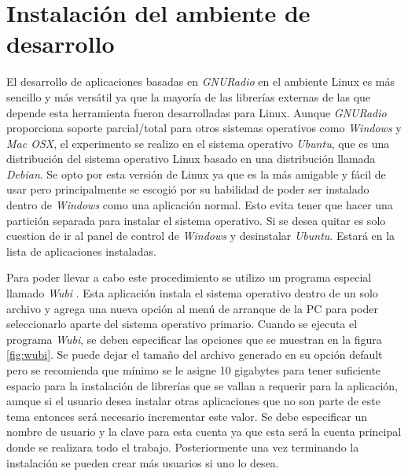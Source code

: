 
\chapter{Instalaci\'on del ambiente de desarrollo}
\label{AppA}

El desarrollo de aplicaciones basadas en \emph{GNURadio} en el ambiente Linux es
m\'as sencillo y m\'as vers\'atil ya que la mayor\'ia de las librer\'ias
externas de las que depende esta herramienta fueron desarrolladas para Linux.
Aunque \emph{GNURadio} proporciona soporte parcial/total para otros sistemas
operativos como \emph{Windows} y \emph{Mac OSX}, el experimento se realizo en el
sistema operativo \emph{Ubuntu}, que es una distribuci\'on del sistema operativo
Linux basado en una distribuci\'on llamada \emph{Debian}. Se opto por esta
versi\'on de Linux ya que es la m\'as amigable y f\'acil de usar pero
principalmente se escogi\'o por su habilidad de poder ser instalado dentro de
\emph{Windows} como una aplicaci\'on normal. Esto evita tener que hacer una
partici\'on separada para instalar el sistema operativo. Si se desea quitar es
solo cuestion de ir al panel de control de \emph{Windows} y desinstalar
\emph{Ubuntu}. Estar\'a en la lista de aplicaciones instaladas.

Para poder llevar a cabo este procedimiento se utilizo un programa especial
llamado \emph{Wubi} \cite{russo}. Esta aplicaci\'on instala el sistema operativo
dentro de un solo archivo y agrega una nueva opci\'on al men\'u de arranque de
la PC para poder seleccionarlo aparte del sistema operativo primario. Cuando se
ejecuta el programa \emph{Wubi}, se deben especificar las opciones que se
muestran en la figura \ref{fig:wubi}. Se puede dejar el tama\~no del archivo
generado en su opci\'on default pero se recomienda que m\'inimo se le asigne 10 gigabytes para
tener suficiente espacio para la instalaci\'on de librer\'ias que se vallan a
requerir para la aplicaci\'on, aunque si el usuario desea instalar otras
aplicaciones que no son parte de este tema entonces ser\'a necesario incrementar
este valor. Se debe especificar un nombre de usuario y la clave para esta cuenta
ya que esta ser\'a la cuenta principal donde se realizara todo el trabajo.
Posteriormente una vez terminando la instalaci\'on se pueden crear m\'as
usuarios si uno lo desea.

